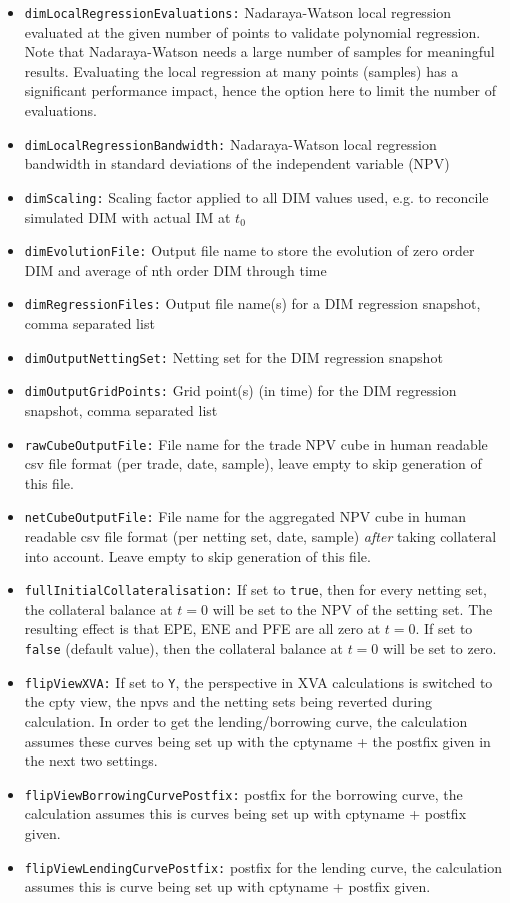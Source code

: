{\begin{itemize}
  AggregationScenarioDataIndices sections (only these scenario data are passed on to the post processor); if the list is
  empty, the NPV will be used as a single regressor
\item {\tt dimLocalRegressionEvaluations:} Nadaraya-Watson local regression evaluated at the given number of points to
validate polynomial regression. Note that Nadaraya-Watson needs a large number of samples for meaningful
results. Evaluating the local regression at many points (samples) has a significant performance impact, hence the option
here to limit the number of evaluations.
\item {\tt dimLocalRegressionBandwidth:} Nadaraya-Watson local regression bandwidth in standard deviations of the
independent variable (NPV)
\item {\tt dimScaling:} Scaling factor applied to all DIM values used, e.g. to reconcile simulated DIM with actual IM at
$t_0$
\item {\tt dimEvolutionFile:} Output file name to store the evolution of zero order DIM and average of nth order DIM
through time
\item {\tt dimRegressionFiles:} Output file name(s) for a DIM regression snapshot, comma separated list
\item {\tt dimOutputNettingSet:} Netting set for the DIM regression snapshot
\item {\tt dimOutputGridPoints:} Grid point(s) (in time) for the DIM regression snapshot, comma separated list
\item {\tt rawCubeOutputFile:} File name for the trade NPV cube in human readable csv file format (per trade, date,
sample), leave empty to skip generation of this file.
\item {\tt netCubeOutputFile:} File name for the aggregated NPV cube in human readable csv file format (per netting set,
date, sample) {\em after} taking collateral into account. Leave empty to skip generation of this file.
\item {\tt fullInitialCollateralisation:} If set to {\tt true}, then for every netting set, the collateral balance at $t=0$ will be set to the NPV of the setting set. The resulting effect is that EPE, ENE and PFE are all zero at $t=0$. If set to {\tt false} (default value), then the collateral balance at $t=0$ will be set to zero.
\item {\tt flipViewXVA:} If set to {\tt Y}, the perspective in XVA calculations is switched to the cpty view, the npvs and the netting sets being reverted during calculation. In order to get the lending/borrowing curve, the calculation assumes these curves being set up with the cptyname + the postfix given in the next two settings.
\item {\tt flipViewBorrowingCurvePostfix:} postfix for the borrowing curve, the calculation assumes this is curves being set up with cptyname + postfix given.
\item {\tt flipViewLendingCurvePostfix:} postfix for the lending curve, the calculation assumes this is curve being set up with cptyname + postfix given.
\end{itemize}

}
